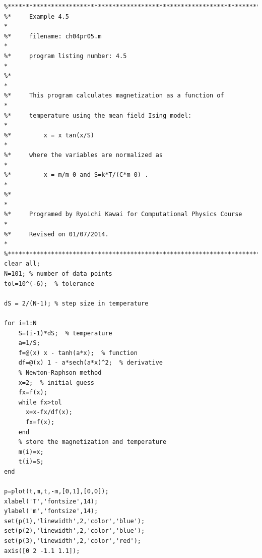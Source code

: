 
\bigskip\noindent
\program
\label{prog:ising}
\footnotesize
\begin{verbatim}
%**************************************************************************
%*     Example 4.5                                                        *
%*     filename: ch04pr05.m                                               *
%*     program listing number: 4.5                                        *
%*                                                                        *
%*     This program calculates magnetization as a function of             *
%*     temperature using the mean field Ising model:                      *
%*         x = x tan(x/S)                                                 *
%*     where the variables are normalized as                              *
%*         x = m/m_0 and S=k*T/(C*m_0) .                                  *
%*                                                                        *
%*     Programed by Ryoichi Kawai for Computational Physics Course        *
%*     Revised on 01/07/2014.                                             *
%**************************************************************************
clear all;
N=101; % number of data points
tol=10^(-6);  % tolerance

dS = 2/(N-1); % step size in temperature

for i=1:N
    S=(i-1)*dS;  % temperature
    a=1/S;
    f=@(x) x - tanh(a*x);  % function
    df=@(x) 1 - a*sech(a*x)^2;  % derivative
    % Newton-Raphson method
    x=2;  % initial guess
    fx=f(x);
    while fx>tol
      x=x-fx/df(x);
      fx=f(x);
    end
    % store the magnetization and temperature  
    m(i)=x;
    t(i)=S;
end

p=plot(t,m,t,-m,[0,1],[0,0]);
xlabel('T','fontsize',14);
ylabel('m','fontsize',14);
set(p(1),'linewidth',2,'color','blue');
set(p(2),'linewidth',2,'color','blue');
set(p(3),'linewidth',2,'color','red');
axis([0 2 -1.1 1.1]);
\end{verbatim}
\normalsize


